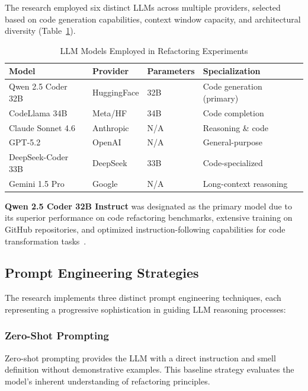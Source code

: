 \documentclass[12pt]{article}
\begin{document}
The research employed six distinct LLMs across multiple providers, selected based on code generation capabilities, context window capacity, and architectural diversity (Table~\ref{tab:llm-models}).

\begin{table}[h]
\centering
\caption{LLM Models Employed in Refactoring Experiments}
\label{tab:llm-models}
\begin{tabular}{@{}llll@{}}
\toprule
\textbf{Model} & \textbf{Provider} & \textbf{Parameters} & \textbf{Specialization} \\ \midrule
Qwen 2.5 Coder 32B & HuggingFace & 32B & Code generation (primary) \\
CodeLlama 34B & Meta/HF & 34B & Code completion \\
Claude Sonnet 4.6 & Anthropic & N/A & Reasoning \& code \\
GPT-5.2 & OpenAI & N/A & General-purpose \\
DeepSeek-Coder 33B & DeepSeek & 33B & Code-specialized \\
Gemini 1.5 Pro & Google & N/A & Long-context reasoning \\ \bottomrule
\end{tabular}
\end{table}

\textbf{Qwen 2.5 Coder 32B Instruct} was designated as the primary model due to its superior performance on code refactoring benchmarks, extensive training on GitHub repositories, and optimized instruction-following capabilities for code transformation tasks~\cite{zheng2024qwen2}.

\subsection{Prompt Engineering Strategies}
\label{sec:prompt-strategies}

The research implements three distinct prompt engineering techniques, each representing a progressive sophistication in guiding LLM reasoning processes:

\subsubsection{Zero-Shot Prompting}

Zero-shot prompting provides the LLM with a direct instruction and smell definition without demonstrative examples. This baseline strategy evaluates the model's inherent understanding of refactoring principles.
\end{document}
